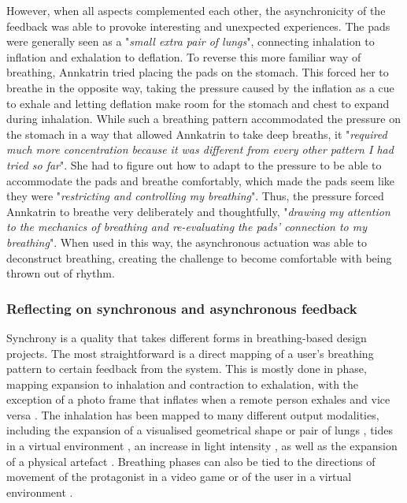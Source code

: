 However, when all aspects complemented each other, the asynchronicity of the feedback was able to provoke interesting and unexpected experiences. The pads were generally seen as a "\textit{small extra pair of lungs}", connecting inhalation to inflation and exhalation to deflation. To reverse this more familiar way of breathing, Annkatrin tried placing the pads on the stomach. This forced her to breathe in the opposite way, taking the pressure caused by the inflation as a cue to exhale and letting deflation make room for the stomach and chest to expand during inhalation. While such a breathing pattern accommodated the pressure on the stomach in a way that allowed Annkatrin to take deep breaths, it "\textit{required much more concentration because it was different from every other pattern I had tried so far}". She had to figure out how to adapt to the pressure to be able to accommodate the pads and breathe comfortably, which made the pads seem like they were "\textit{restricting and controlling my breathing}". Thus, the pressure forced Annkatrin to breathe very deliberately and thoughtfully, "\textit{drawing my attention to the mechanics of breathing and re-evaluating the pads’ connection to my breathing}". When used in this way, the asynchronous actuation was able to deconstruct breathing, creating the challenge to become comfortable with being thrown out of rhythm.


\subsubsection{Reflecting on synchronous and asynchronous feedback}

Synchrony is a quality that takes different forms in breathing-based design projects. The most straightforward is a direct mapping of a user's breathing pattern to certain feedback from the system. This is mostly done in phase, mapping expansion to inhalation and contraction to exhalation, with the exception of a photo frame that inflates when a remote person exhales and vice versa \cite{kim_breathingframe_2015}. The inhalation has been mapped to many different output modalities, including the expansion of a visualised geometrical shape \cite{van_rooij_deep_2016, prpa_hacking_2016, wongsuphasawat_you_2012} or pair of lungs \cite{abushakra_augmenting_2014}, tides in a virtual environment \cite{roo_inner_2017}, an increase in light intensity \cite{dijk_breathe_2011, stahl_soma_2016}, as well as the expansion of a physical artefact \cite{aslan_hold_2016, kim_breathingframe_2015, sun_breath_2017, moran_exopranayama:_2016, sjoman_breathing_2018}. Breathing phases can also be tied to the directions of movement of the protagonist in a video game \cite{sonne_chillfish_2016} or of the user in a virtual environment \cite{van_rooij_deep_2016, davies_osmose:_1996, prpa_hacking_2016}.

